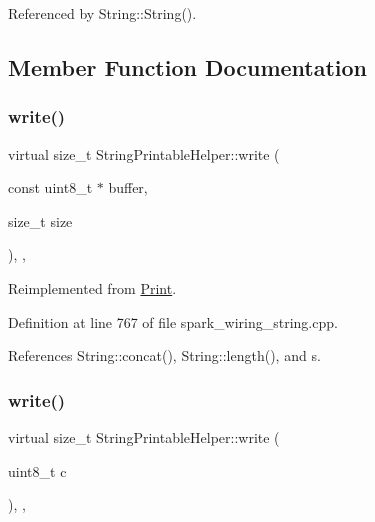 Referenced by String\+::\+String().



\subsection{Member Function Documentation}
\mbox{\label{class_string_printable_helper_a8098bfb565b518cec0cf9e6fbc68eed8}} 
\subsubsection{\texorpdfstring{write()}{write()}\hspace{0.1cm}{\footnotesize\ttfamily [1/2]}}
{\footnotesize\ttfamily virtual size\+\_\+t String\+Printable\+Helper\+::write (\begin{DoxyParamCaption}\item[{const uint8\+\_\+t $\ast$}]{buffer,  }\item[{size\+\_\+t}]{size }\end{DoxyParamCaption})\hspace{0.3cm}{\ttfamily [inline]}, {\ttfamily [override]}, {\ttfamily [virtual]}}



Reimplemented from \hyperlink{class_print_ad98d820df11e2697be1e4b1ea30b4a23}{Print}.



Definition at line 767 of file spark\+\_\+wiring\+\_\+string.\+cpp.



References String\+::concat(), String\+::length(), and s.

\mbox{\label{class_string_printable_helper_adc5aab11289f917cefa1225b59afde2a}} 
\subsubsection{\texorpdfstring{write()}{write()}\hspace{0.1cm}{\footnotesize\ttfamily [2/2]}}
{\footnotesize\ttfamily virtual size\+\_\+t String\+Printable\+Helper\+::write (\begin{DoxyParamCaption}\item[{uint8\+\_\+t}]{c }\end{DoxyParamCaption})\hspace{0.3cm}{\ttfamily [inline]}, {\ttfamily [override]}, {\ttfamily [virtual]}}



